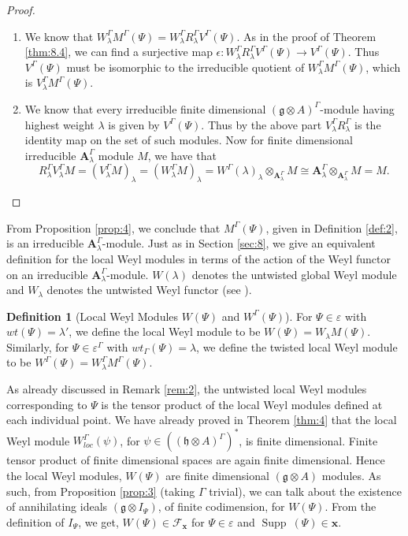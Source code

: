 \documentclass[11pt]{amsart}
\theoremstyle{plain}
\theoremstyle{definition}
\newtheorem{defn}[thm]{Definition}
\newcommand{\g}{\mathfrak{g}}
\newcommand{\h}{\mathfrak{h}}
\newcommand{\A}{\mathbf{A}_{\lambda}^{\Gamma}}
\newcommand{\LW}{W_{loc}^{\Gamma}(\psi)}
\DeclareMathOperator{\Supp}{Supp}
\begin{document}
\begin{proof}
    \begin{enumerate}[label=(\alph*)]
\item We know that $W_{\lambda}^{\Gamma}M^{\Gamma}(\Psi)=W_{\lambda}^{\Gamma}R_{\lambda}^{\Gamma}V^{\Gamma}(\Psi)$. As in the proof of Theorem \ref{thm:8.4}, we can find a surjective map $\epsilon:W_{\lambda}^{\Gamma}R_{\lambda}^{\Gamma}V^{\Gamma}(\Psi)\rightarrow V^{\Gamma}(\Psi)$. Thus $V^{\Gamma}(\Psi)$ must be isomorphic to the irreducible quotient of $W_{\lambda}^{\Gamma}M^{\Gamma}(\Psi)$, which is $V_{\lambda}^{\Gamma}M^{\Gamma}(\Psi)$.
\item We know that every irreducible finite dimensional $(\g\otimes A)^{\Gamma}$-module having highest weight $\lambda$ is given by $V^{\Gamma}(\Psi)$. Thus by the above part $V_{\lambda}^{\Gamma}R_{\lambda}^{\Gamma}$ is the identity map on the set of such modules. Now for finite dimensional  irreducible $\A$ module $M$, we have that
\begin{equation*}
R_{\lambda}^{\Gamma}V_{\lambda}^{\Gamma}M=(V_{\lambda}^{\Gamma}M)_{\lambda}=(W_{\lambda}^{\Gamma}M)_{\lambda}=W^{\Gamma}(\lambda)_{\lambda}\otimes_{\A} M\cong \A\otimes_{\A} M =M.
\end{equation*}
\end{enumerate}
\end{proof}
From Proposition \ref{prop:4}, we conclude that $M^{\Gamma}(\Psi)$, given in Definition \ref{def:2}, is an irreducible $\A$-module. Just as in Section \ref{sec:8}, we give an equivalent definition for the local Weyl modules in terms of the action of the Weyl functor on an irreducible $\A$-module.  $W(\lambda)$ denotes the untwisted global Weyl module and $W_{\lambda}$ denotes the untwisted Weyl functor (see \cite{BCM19}).  
\begin{defn} [Local Weyl Modules $W(\Psi)$ and $W^{\Gamma}(\Psi)$]\label{def:3}
   For $\Psi\in\varepsilon$ with $wt(\Psi)=\lambda'$, we define the local Weyl module to be $W(\Psi)=W_{\lambda}M(\Psi)$. Similarly, for  $\Psi\in\varepsilon^{\Gamma}$ with $wt_{\Gamma}(\Psi)=\lambda$, we define the twisted local Weyl module to be $W^{\Gamma}(\Psi)=W_{\lambda}^{\Gamma}M^{\Gamma}(\Psi)$.
\end{defn}
As already discussed in Remark \ref{rem:2}, the untwisted local Weyl modules corresponding to $\Psi$ is the tensor product of the local Weyl modules defined at each individual point. We have already proved in Theorem \ref{thm:4} that the local Weyl module $\LW$, for $\psi\in((\h\otimes A)^{\Gamma})^{*}$, is finite dimensional. Finite tensor product of finite dimensional spaces are again finite dimensional. Hence the local Weyl modules, $W(\Psi)$ are finite dimensional $(\g\otimes A)$  modules. As such, from Proposition \ref{prop:3} (taking $\Gamma$ trivial),  we can talk about the existence of annihilating ideals $(\g\otimes I_{\Psi})$, of finite codimension, for $W(\Psi)$. From the definition of $I_{\Psi}$, we get, $W(\Psi)\in\mathcal{F}_{\textbf{x}}$ for $\Psi\in\varepsilon$ and $ \Supp\ (\Psi)\in\textbf{x}$.
\smallskip
\end{document}
